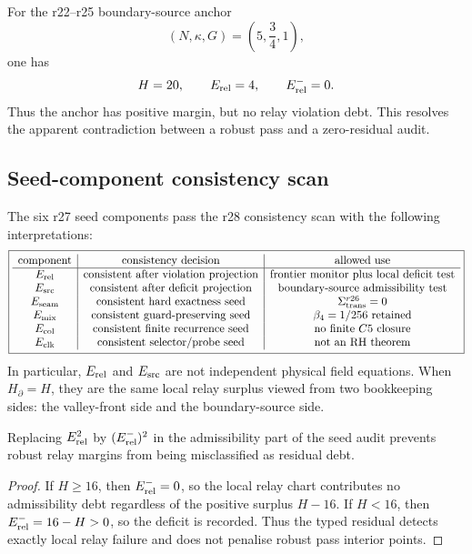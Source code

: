 For the r22--r25 boundary-source anchor
\[
(N,\kappa,G)=\left(5,\frac34,1\right),
\]
one has
\[
H=20,
\qquad
E_{\rm rel}=4,
\qquad
E_{\rm rel}^{-}=0.
\]
Thus the anchor has positive margin, but no relay violation debt.  This resolves
the apparent contradiction between a robust pass and a zero-residual audit.

\subsection{Seed-component consistency scan}
\label{subsec:v470-r28-seed-component-consistency-scan}

The six r27 seed components pass the r28 consistency scan with the following
interpretations:
\[
\boxed{
\begin{array}{c|c|c}
\text{component} & \text{consistency decision} & \text{allowed use}\\
\hline
E_{\rm rel} & \text{consistent after violation projection} &
\text{frontier monitor plus local deficit test}\\
E_{\rm src} & \text{consistent after deficit projection} &
\text{boundary-source admissibility test}\\
E_{\rm seam} & \text{consistent hard exactness seed} &
\Sigma_{\rm trans}^{r26}=0\\
E_{\rm mix} & \text{consistent guard-preserving seed} &
\beta_4=1/256\text{ retained}\\
E_{\rm col} & \text{consistent finite recurrence seed} &
\text{no finite }C5\text{ closure}\\
E_{\rm clk} & \text{consistent selector/probe seed} &
\text{not an RH theorem}
\end{array}
}
\]
In particular, \(E_{\rm rel}\) and \(E_{\rm src}\) are not independent physical
field equations.  When \(H_{\partial}=H\), they are the same local relay surplus
viewed from two bookkeeping sides: the valley-front side and the boundary-source
side.

\begin{lemma}
\label{lem:v470-r28-frontier-square-artefact-removed}
Replacing \(E_{\rm rel}^2\) by \((E_{\rm rel}^{-})^2\) in the admissibility part
of the seed audit prevents robust relay margins from being misclassified as
residual debt.
\end{lemma}

\begin{proof}
If \(H\geq16\), then \(E_{\rm rel}^{-}=0\), so the local relay chart contributes
no admissibility debt regardless of the positive surplus \(H-16\).  If \(H<16\),
then \(E_{\rm rel}^{-}=16-H>0\), so the deficit is recorded.  Thus the typed
residual detects exactly local relay failure and does not penalise robust pass
interior points.
\end{proof}

